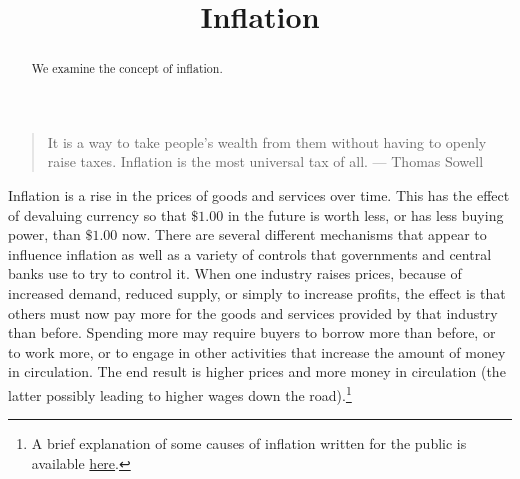 \documentclass{ximera}
\title{Inflation}
\begin{document}
\begin{abstract}
We examine the concept of inflation.
\end{abstract}
\maketitle

\begin{quote}
It is a way to take people's wealth from them without having to openly raise taxes. Inflation is the most universal tax of all. --- Thomas Sowell
\end{quote}

Inflation is a rise in the prices of goods and services over time. This has the effect of devaluing currency so that $\$1.00$ in the future is worth less, or has less buying power, than $\$1.00$ now. There are several different mechanisms that appear to influence inflation as well as a variety of controls that governments and central banks use to try to control it. When one industry raises prices, because of increased demand, reduced supply, or simply to increase profits, the effect is that others must now pay more for the goods and services provided by that industry than before. Spending more may require buyers to borrow more than before, or to work more, or to engage in other activities that increase the amount of money in circulation. The end result is higher prices and more money in circulation (the latter possibly leading to higher wages down the road).\footnote{A brief explanation of some causes of inflation written for the public is available \href{http://www.forbes.com/sites/johntharvey/2011/05/30/what-actually-causes-inflation/}{here}.}
\end{document}

